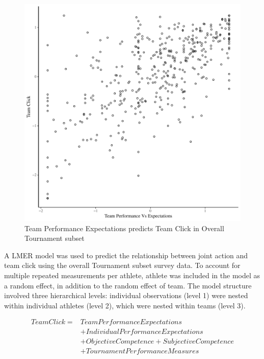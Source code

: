 \begin{figure}[htbp]
  \centering
\includegraphics[scale=.5]{images/teamPerfClickOverallBasicXY.pdf}
  \caption{Team Performance Expectations predicts Team Click in Overall Tournament subset}
  \label{fig:teamPerfClickOverallBasicXY}
\end{figure}

A LMER model was used to predict the relationship between joint action and team click using the overall Tournament subset survey data.  To account for multiple repeated measurements per athlete, athlete was included in the model as a random effect, in addition to the random effect of team.  The model structure involved three hierarchical levels: individual observations (level 1) were nested within individual athletes (level 2), which were nested within teams (level 3).


       \begin{align*}
         Team Click =  & Team Performance Expectations  \\
                   &+ Individual Performance Expectations   \\
                   &+ Objective Competence + Subjective Competence \\
                   &+ TournamentPerformanceMeasures  \\
       \end{align*}

